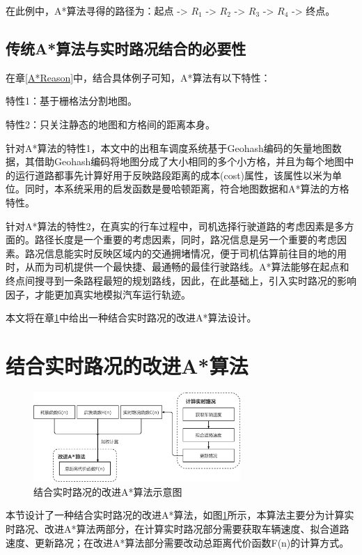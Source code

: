 在此例中，A*算法寻得的路径为：起点 -> $R_1$ -> $R_2$ -> $R_3$ -> $R_4$ -> 终点。

\subsection{传统A*算法与实时路况结合的必要性}

在章\ref{A*Reason}中，结合具体例子可知，A*算法有以下特性：

特性1：基于栅格法分割地图。

特性2：只关注静态的地图和方格间的距离本身。

针对A*算法的特性1，本文中的出租车调度系统基于Geohash编码的矢量地图数据，其借助Geohash编码将地图分成了大小相同的多个小方格，并且为每个地图中的运行道路都事先计算好用于反映路段距离的成本(cost)属性，该属性以米为单位。同时，本系统采用的启发函数是曼哈顿距离，符合地图数据和A*算法的方格特性。

针对A*算法的特性2，在真实的行车过程中，司机选择行驶道路的考虑因素是多方面的。路径长度是一个重要的考虑因素，同时，路况信息是另一个重要的考虑因素。路况信息能实时反映区域内的交通拥堵情况，便于司机估算前往目的地的用时，从而为司机提供一个最快捷、最通畅的最佳行驶路线。A*算法能够在起点和终点间搜寻到一条路程最短的规划路线，因此，在此基础上，引入实时路况的影响因子，才能更加真实地模拟汽车运行轨迹。

本文将在章\ref{A*New}中给出一种结合实时路况的改进A*算法设计。

\section{结合实时路况的改进A*算法}
\label{A*New}

\begin{figure}[!ht]
  \centering
  \includegraphics[width=0.7\textwidth]{undergraduate-thesis/images/Astar_new.png}
  \caption{结合实时路况的改进A*算法示意图}
  \label{newAstarIdea} %
\end{figure}

本节设计了一种结合实时路况的改进A*算法，如图\ref{newAstarIdea}所示，本算法主要分为计算实时路况、改进A*算法两部分，在计算实时路况部分需要获取车辆速度、拟合道路速度、更新路况；在改进A*算法部分需要改动总距离代价函数F(n)的计算方式。

